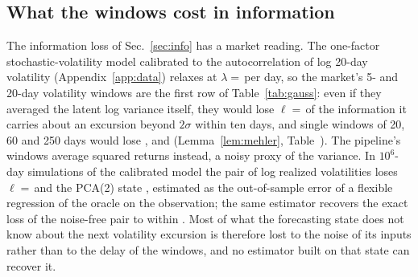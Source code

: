 \subsection{What the windows cost in information}\label{sec:mktinfo}

The information loss of Sec.~\ref{sec:info} has a market reading. The one-factor stochastic-volatility model calibrated to the autocorrelation of log 20-day volatility (Appendix~\ref{app:data}) relaxes at $\lambda=\,$\LamMkt per day, so the market's 5- and 20-day volatility windows are the first row of Table~\ref{tab:gauss}: even if they averaged the latent log variance itself, they would lose $\ell=\,$\EllMktPair of the information it carries about an excursion beyond $2\sigma$ within ten days, and single windows of 20, 60 and 250 days would lose \EllWinTwenty, \EllWinSixty and \EllWinTwoFifty (Lemma~\ref{lem:mehler}, Table~). The pipeline's windows average squared returns instead, a noisy proxy of the variance. In $10^6$-day simulations of the calibrated model the pair of log realized volatilities loses $\ell=\,$\EllMktRV and the PCA(2) state \EllMktPca, estimated as the out-of-sample error of a flexible regression of the oracle on the observation; the same estimator recovers the exact loss of the noise-free pair to within \EllCheckDiff. Most of what the forecasting state does not know about the next volatility excursion is therefore lost to the noise of its inputs rather than to the delay of the windows, and no estimator built on that state can recover it.

